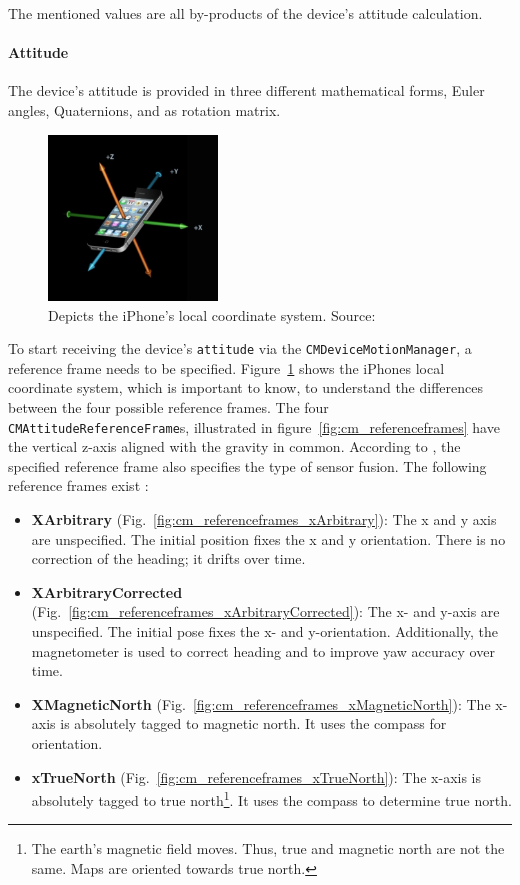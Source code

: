 \noindent The mentioned values are all by-products of the device's attitude calculation.

\paragraph{Attitude} The device's attitude is provided in three different mathematical forms, Euler angles, Quaternions, and as rotation matrix.

\begin{figure}
	\includegraphics[width=0.4\textwidth]{figures/iphone_coordinatesystem}
	\caption{Depicts the iPhone's local coordinate system. Source:~\citep{apple:wwdc_2012_pham}}
	\label{fig:iphone_cs}
\end{figure}

To start receiving the device's \texttt{attitude} via the \texttt{CMDeviceMotionManager}, a reference frame needs to be specified. Figure~\ref{fig:iphone_cs} shows the iPhones local coordinate system, which is important to know, to understand the differences between the four possible reference frames. The four \texttt{CMAttitudeReferenceFrame}s, illustrated in figure~\ref{fig:cm_referenceframes} have the vertical z-axis aligned with the gravity in common. According to \citet{apple:wwdc_2014_pham}, the specified reference frame also specifies the type of sensor fusion. The following reference frames exist \citep{apple:wwdc_2014_pham,apple:ios_doc_cm}:
\begin{itemize}
  \item \textbf{XArbitrary} (Fig.~\ref{fig:cm_referenceframes_xArbitrary}): The x and y axis are unspecified. The initial position fixes the x and y orientation. There is no correction of the heading; it drifts over time.
  \item \textbf{XArbitraryCorrected} (Fig.~\ref{fig:cm_referenceframes_xArbitraryCorrected}): The x- and y-axis are unspecified. The initial pose fixes the x- and y-orientation. Additionally, the magnetometer is used to correct heading and to improve yaw accuracy over time.
  \item \textbf{XMagneticNorth} (Fig.~\ref{fig:cm_referenceframes_xMagneticNorth}): The x-axis is absolutely tagged to magnetic north. It uses the compass for orientation.
  \item \textbf{xTrueNorth} (Fig.~\ref{fig:cm_referenceframes_xTrueNorth}): The x-axis is absolutely tagged to true north\footnote{The earth's magnetic field moves. Thus, true and magnetic north are not the same. Maps are oriented towards true north.}. It uses the compass to determine true north.
\end{itemize}

